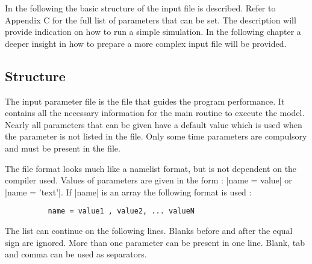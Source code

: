
%
%
%
%
%
%
%

In the following the basic structure of the input file is described. Refer to Appendix C 
for the full list of parameters that can be set. The description will provide indication on how to run a simple simulation.
In the following chapter a deeper insight in how to prepare a more complex input file will be provided.


\subsection{Structure}

The input parameter file is the file that guides the program performance. It
contains all the necessary information for the main routine to execute
the model. Nearly all parameters that can be given have a default value
which is used when the parameter is not listed in the file. Only some
time parameters are compulsory and must be present in the file.

The file format looks much like a namelist format, but is
not dependent on the compiler used. Values of parameters are given
in the form :  
|name = value|  or  |name = 'text'|.  If |name|
is an array the following format is used : 
\begin{verbatim}
          name = value1 , value2, ... valueN
\end{verbatim}
The list can continue on the following lines. Blanks before and after
the equal sign are ignored. More than one parameter can be present
in one line. Blank, tab and comma can be used as separators.

